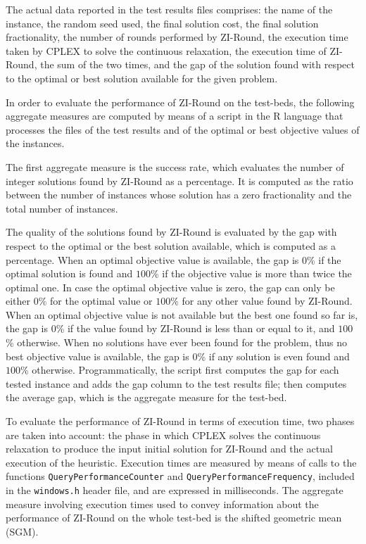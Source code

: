 \documentclass[a4paper,12pt,twoside]{scrbook}
\begin{document}
The actual data reported in the test results files comprises: the name of the instance, the random seed used, the final solution cost, the final solution fractionality, the number of rounds performed by ZI-Round, the execution time taken by CPLEX to solve the continuous relaxation, the execution time of ZI-Round, the sum of the two times, and the gap of the solution found with respect to the optimal or best solution available for the given problem. \par 

In order to evaluate the performance of ZI-Round on the test-beds, the following aggregate measures are computed by means of a script in the R language that processes the files of the test results and of the optimal or best objective values of the instances. \par
The first aggregate measure is the success rate, which evaluates the number of integer solutions found by ZI-Round as a percentage. It is computed as the ratio between the number of instances whose solution has a zero fractionality and the total number of instances. \par
The quality of the solutions found by ZI-Round is evaluated by the gap with respect to the optimal or the best solution available, which is computed as a percentage. When an optimal objective value is available, the gap is $0$\% if the optimal solution is found and $100$\% if the objective value is more than twice the optimal one. In case the optimal objective value is zero, the gap can only be either $0$\% for the optimal value or $100$\% for any other value found by ZI-Round. When an optimal objective value is not available but the best one found so far is, the gap is $0$\% if the value found by ZI-Round is less than or equal to it, and $100$\% otherwise. When no solutions have ever been found for the problem, thus no best objective value is available, the gap is $0$\% if any solution is even found and $100$\% otherwise. Programmatically, the script first computes the gap for each tested instance and adds the gap column to the test results file; then computes the average gap, which is the aggregate measure for the test-bed. \par
To evaluate the performance of ZI-Round in terms of execution time, two phases are taken into account: the phase in which CPLEX solves the continuous relaxation to produce the input initial solution for ZI-Round and the actual execution of the heuristic. Execution times are measured by means of calls to the functions \texttt{QueryPerformanceCounter} and \texttt{QueryPerformanceFrequency}, included in the \texttt{windows.h} header file, and are expressed in milliseconds. The aggregate measure involving execution times used to convey information about the performance of ZI-Round on the whole test-bed is the shifted geometric mean (SGM). 
\end{document}
